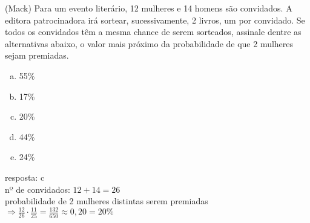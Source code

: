 \begin{ex}(Mack) Para um evento literário, 12 mulheres e 14 homens são  convidados. A editora patrocinadora irá sortear, sucessivamente, 2 livros, um por convidado. Se todos os convidados têm  a mesma chance de serem sorteados, assinale dentre as alternativas abaixo, o valor mais próximo da probabilidade de que 2 mulheres sejam premiadas.
    \begin{enumerate}  [(a)]
        \item 55\%
        \item 17\%
        \item 20\%
        \item 44\%
        \item 24\%
    \end{enumerate}
      \begin{sol}
       resposta: c \\
       nº de convidados: $12+14=26$\\
       probabilidade de 2 mulheres distintas serem premiadas  $\Rightarrow \frac{12}{26}\cdot\frac{11}{25}=\frac{132}{650}\approx 0,20=20\%$
      \end{sol}
 \end{ex}